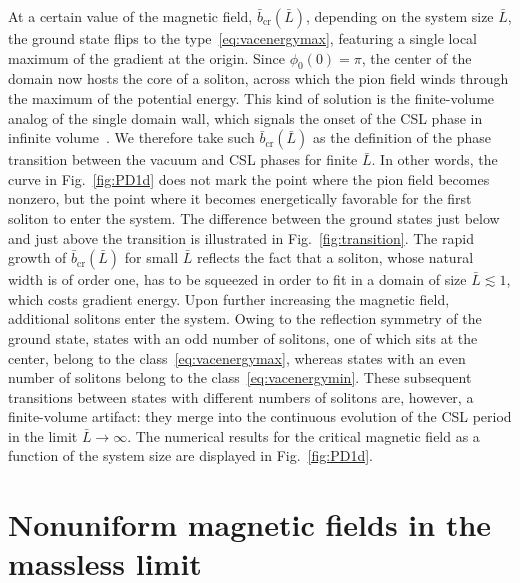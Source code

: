 \documentclass[pdflatex,iicol,sn-mathphys-num]{sn-jnl}
\let\p=\phi
\newcommand{\bmag}{b}%
\begin{document}
At a certain value of the magnetic field, $\bar\bmag_\text{cr}(\bar L)$, depending on the system size $\bar L$, the ground state flips to the type~\eqref{eq:vacenergymax}, featuring a single local maximum of the gradient at the origin. Since $\p_0(0)=\pi$, the center of the domain now hosts the core of a soliton, across which the pion field winds through the maximum of the potential energy. This kind of solution is the finite-volume analog of the single domain wall, which signals the onset of the CSL phase in infinite volume~\cite{Son:2007ny}. We therefore take such $\bar\bmag_\text{cr}(\bar L)$ as the definition of the phase transition between the vacuum and CSL phases for finite $\bar L$. In other words, the curve in Fig.~\ref{fig:PD1d} does not mark the point where the pion field becomes nonzero, but the point where it becomes energetically favorable for the first soliton to enter the system. The difference between the ground states just below and just above the transition is illustrated in Fig.~\ref{fig:transition}. The rapid growth of $\bar\bmag_\text{cr}(\bar L)$ for small $\bar L$ reflects the fact that a soliton, whose natural width is of order one, has to be squeezed in order to fit in a domain of size $\bar L\lesssim1$, which costs gradient energy. Upon further increasing the magnetic field, additional solitons enter the system. Owing to the reflection symmetry of the ground state, states with an odd number of solitons, one of which sits at the center, belong to the class~\eqref{eq:vacenergymax}, whereas states with an even number of solitons belong to the class~\eqref{eq:vacenergymin}. These subsequent transitions between states with different numbers of solitons are, however, a finite-volume artifact: they merge into the continuous evolution of the CSL period in the limit $\bar L\to\infty$. The numerical results for the critical magnetic field as a function of the system size are displayed in Fig.~\ref{fig:PD1d}.


\section{Nonuniform magnetic fields in the massless limit}
\label{sec:nonuniformBzeroM}
\end{document}
